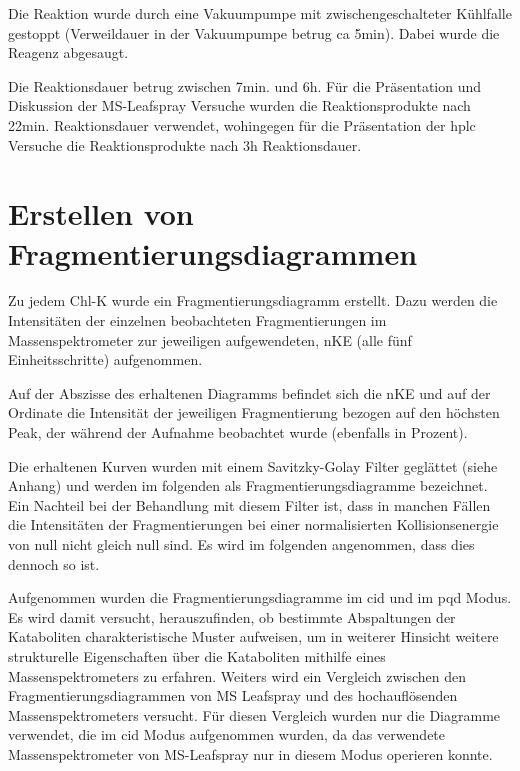 Die Reaktion wurde durch eine Vakuumpumpe mit zwischengeschalteter Kühlfalle gestoppt (Verweildauer in der Vakuumpumpe betrug \gls{ca} 5min). Dabei wurde die Reagenz abgesaugt. 

Die Reaktionsdauer betrug zwischen 7min. und 6h. Für die Präsentation und Diskussion der MS-Leafspray Versuche wurden die Reaktionsprodukte nach 22min. Reaktionsdauer verwendet, wohingegen für die Präsentation der \gls{hplc} Versuche die Reaktionsprodukte nach 3h Reaktionsdauer.

\section{Erstellen von Fragmentierungsdiagrammen} \label{sec:fragmentierungsdiagramme}

Zu jedem \gls{Chl-K} wurde ein Fragmentierungsdiagramm erstellt. Dazu werden die Intensitäten der einzelnen beobachteten Fragmentierungen im Massenspektrometer zur jeweiligen aufgewendeten, \gls{nKE} (alle fünf Einheitsschritte) aufgenommen. 

Auf der Abszisse des erhaltenen Diagramms befindet sich die \gls{nKE} und auf der Ordinate die Intensität der jeweiligen Fragmentierung bezogen auf den höchsten Peak, der während der Aufnahme beobachtet wurde (ebenfalls in Prozent). 

Die erhaltenen Kurven wurden mit einem Savitzky-Golay Filter geglättet (siehe Anhang) und werden im folgenden als Fragmentierungsdiagramme bezeichnet. Ein Nachteil bei der Behandlung mit diesem Filter ist, dass in manchen Fällen die Intensitäten der Fragmentierungen bei einer normalisierten Kollisionsenergie von null nicht gleich null sind. Es wird im folgenden angenommen, dass dies dennoch so ist.

Aufgenommen wurden die Fragmentierungsdiagramme im \gls{cid} und im \gls{pqd} Modus.\\

Es wird damit versucht, herauszufinden, ob bestimmte Abspaltungen der Kataboliten charakteristische Muster aufweisen, um in weiterer Hinsicht weitere strukturelle Eigenschaften über die Kataboliten mithilfe eines Massenspektrometers zu erfahren. Weiters wird ein Vergleich zwischen den Fragmentierungsdiagrammen von MS Leafspray und des hochauflösenden Massenspektrometers versucht. Für diesen Vergleich wurden nur die Diagramme verwendet, die im \gls{cid} Modus aufgenommen wurden, da das verwendete Massenspektrometer von MS-Leafspray nur in diesem Modus operieren konnte.
